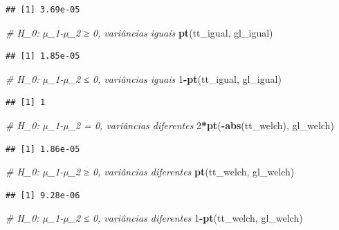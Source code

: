 \documentclass[
]{book}
\newenvironment{Shaded}{\begin{snugshade}}{\end{snugshade}}
\newcommand{\CommentTok}[1]{\textcolor[rgb]{0.56,0.35,0.01}{\textit{#1}}}
\newcommand{\DecValTok}[1]{\textcolor[rgb]{0.00,0.00,0.81}{#1}}
\newcommand{\KeywordTok}[1]{\textcolor[rgb]{0.13,0.29,0.53}{\textbf{#1}}}
\newcommand{\NormalTok}[1]{#1}
\newcommand{\OperatorTok}[1]{\textcolor[rgb]{0.81,0.36,0.00}{\textbf{#1}}}
\theoremstyle{definition}
\theoremstyle{definition}
\theoremstyle{definition}
\theoremstyle{remark}
\begin{document}
\begin{verbatim}
## [1] 3.69e-05
\end{verbatim}

\begin{Shaded}
\begin{Highlighting}[]
\CommentTok{\# H\_0: µ\_1{-}µ\_2 ≥ 0, variâncias iguais}
\KeywordTok{pt}\NormalTok{(tt\_igual, gl\_igual)         }
\end{Highlighting}
\end{Shaded}

\begin{verbatim}
## [1] 1.85e-05
\end{verbatim}

\begin{Shaded}
\begin{Highlighting}[]
\CommentTok{\# H\_0: µ\_1{-}µ\_2 ≤ 0, variâncias iguais}
\DecValTok{1}\OperatorTok{{-}}\KeywordTok{pt}\NormalTok{(tt\_igual, gl\_igual)       }
\end{Highlighting}
\end{Shaded}

\begin{verbatim}
## [1] 1
\end{verbatim}

\begin{Shaded}
\begin{Highlighting}[]
\CommentTok{\# H\_0: µ\_1{-}µ\_2 = 0, variâncias diferentes}
\DecValTok{2}\OperatorTok{*}\KeywordTok{pt}\NormalTok{(}\OperatorTok{{-}}\KeywordTok{abs}\NormalTok{(tt\_welch), gl\_welch) }
\end{Highlighting}
\end{Shaded}

\begin{verbatim}
## [1] 1.86e-05
\end{verbatim}

\begin{Shaded}
\begin{Highlighting}[]
\CommentTok{\# H\_0: µ\_1{-}µ\_2 ≥ 0, variâncias diferentes}
\KeywordTok{pt}\NormalTok{(tt\_welch, gl\_welch)         }
\end{Highlighting}
\end{Shaded}

\begin{verbatim}
## [1] 9.28e-06
\end{verbatim}

\begin{Shaded}
\begin{Highlighting}[]
\CommentTok{\# H\_0: µ\_1{-}µ\_2 ≤ 0, variâncias diferentes}
\DecValTok{1}\OperatorTok{{-}}\KeywordTok{pt}\NormalTok{(tt\_welch, gl\_welch)       }
\end{Highlighting}
\end{Shaded}
\end{document}
